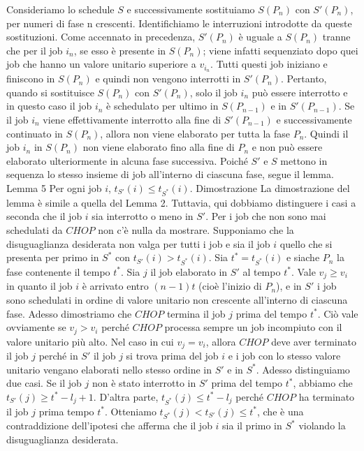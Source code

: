 \documentclass[12pt]{article}
\begin{document}
Consideriamo lo schedule $S$ e successivamente sostituiamo $S(P_{n})$ con $S'(P_{n})$, per numeri di fase n crescenti. Identifichiamo le interruzioni introdotte da queste sostituzioni. Come accennato in precedenza, $S'(P_{n})$ è uguale a $S(P_{n})$ tranne che per il job $i_{n}$, se esso è presente in $S(P_{n})$; viene infatti sequenziato dopo quei job che hanno un valore unitario superiore a $v_{i_{n}}$. Tutti questi job iniziano e finiscono in $S(P_{n})$ e quindi non vengono interrotti in $S'(P_{n})$. Pertanto, quando si sostituisce $S(P_{n})$ con $S'(P_{n})$, solo il job $i_{n}$ può essere interrotto e in questo caso il job $i_{n}$ è schedulato per ultimo in $S(P_{n-1})$ e in $S'(P_{n-1})$. Se il job $i_{n}$ viene effettivamente interrotto alla fine di $S'(P_{n-1})$ e successivamente continuato in $S(P_{n})$, allora non viene elaborato per tutta la fase $P_{n}$. Quindi il job $i_{n}$ in $S(P_{n})$ non viene elaborato fino alla fine di $P_{n}$ e non può essere elaborato ulteriormente in alcuna fase successiva. Poiché $S'$ e $S$ mettono in sequenza lo stesso insieme di job all'interno di ciascuna fase, segue il lemma.
Lemma 5
Per ogni job $i$, $t_{S'}(i) \leq t_{S^{*}}(i)$.
Dimostrazione
La dimostrazione del lemma è simile a quella del Lemma 2. Tuttavia, qui dobbiamo distinguere i casi a seconda che il job $i$ sia interrotto o meno in $S'$. Per i job che non sono mai schedulati da $CHOP$ non c'è nulla da mostrare. Supponiamo che la disuguaglianza desiderata non valga per tutti i job e sia il job $i$ quello che si presenta per primo in $S^{*}$ con $t_{S'}(i) > t_{S^{*}}(i)$. Sia $t^{*} = t_{S^{*}}(i)$ e siache $P_{n}$ la fase contenente il tempo $t^{*}$. Sia $j$ il job elaborato in $S'$ al tempo $t^{*}$. Vale $v_{j} \geq v_{i}$ in quanto il job $i$ è arrivato entro $(n - 1)t$ (cioè l'inizio di $P_{n}$), e in $S'$ i job sono schedulati in ordine di valore unitario non crescente all'interno di ciascuna fase. Adesso dimostriamo che $CHOP$ termina il job $j$ prima del tempo $t^{*}$. Ciò vale ovviamente se $v_{j} > v_{i}$ perché $CHOP$ processa sempre un job incompiuto con il valore unitario più alto. Nel caso in cui $v_{j} = v_{i}$, allora $CHOP$ deve aver terminato il job $j$ perché in $S'$ il job $j$ si trova prima del job $i$ e i job con lo stesso valore unitario vengano elaborati nello stesso ordine in $S'$ e in $S^{*}$. Adesso distinguiamo due casi. Se il job $j$ non è stato interrotto in $S'$ prima del tempo $t^{*}$, abbiamo che $t_{S'}(j) \geq t^{*} - l_{j} + 1$. D'altra parte, $t_{S^{*}}(j) \leq t^{*} - l_{j}$ perché $CHOP$ ha terminato il job $j$ prima tempo $t^{*}$. Otteniamo $t_{S^{*}}(j) < t_{S'}(j) \leq t^{*}$, che è una contraddizione dell'ipotesi che afferma che il job $i$ sia il primo in $S^{*}$ violando la disuguaglianza desiderata. 
\end{document}
